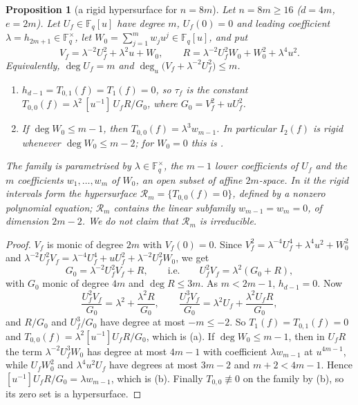 \documentclass[11pt,a4paper]{amsart}
\newtheorem{proposition}[theorem]{Proposition}
\theoremstyle{remark}
\numberwithin{equation}{section}
\newcommand{\Fq}{\mathbb{F}_q}
\begin{document}
\begin{proposition}[a rigid hypersurface for $n=8m$]\label{prop:sporadic}
Let $n=8m\ge 16$ ($d=4m$, $e=2m$). Let $U_f\in\Fq[u]$ have degree $m$, $U_f(0)=0$ and leading coefficient
$\lambda=h_{2m+1}\in\Fq^\times$, let $W_0=\sum_{j=1}^{m}w_ju^j\in\Fq[u]$, and put
\[
V_f=\lambda^{-2}U_f^2+\lambda^2u+W_0,\qquad R=\lambda^{-2}U_f^2W_0+W_0^2+\lambda^4u^2 .
\]
Equivalently, $\deg U_f=m$ and $\deg_u\bigl(V_f+\lambda^{-2}U_f^2\bigr)\le m$.
\begin{enumerate}
\item[(a)] $h_{d-1}=T_{0,1}(f)=T_1(f)=0$, so $\tau_f$ is the constant
$T_{0,0}(f)=\lambda^2\,[u^{-1}]\,U_fR/G_0$, where $G_0=V_f^2+uU_f^2$.
\item[(b)] If $\deg W_0\le m-1$, then $T_{0,0}(f)=\lambda^3w_{m-1}$. In particular $I_2(f)$ is rigid whenever
$\deg W_0\le m-2$; for $W_0=0$ this is \cite[Proposition~3.3]{ChenShort}.
\end{enumerate}
The family is parametrised by $\lambda\in\Fq^\times$, the $m-1$ lower coefficients of $U_f$ and the $m$
coefficients $w_1,\dots,w_m$ of $W_0$, an open subset of affine $2m$-space. In it the rigid intervals form the
hypersurface $\mathcal R_m=\{T_{0,0}(f)=0\}$, defined by a nonzero polynomial equation; $\mathcal R_m$ contains the
linear subfamily $w_{m-1}=w_m=0$, of dimension $2m-2$. We do not claim that $\mathcal R_m$ is irreducible.
\end{proposition}

\begin{proof}
$V_f$ is monic of degree $2m$ with $V_f(0)=0$. Since $V_f^2=\lambda^{-4}U_f^4+\lambda^4u^2+W_0^2$ and
$\lambda^{-2}U_f^2V_f=\lambda^{-4}U_f^4+uU_f^2+\lambda^{-2}U_f^2W_0$, we get
\[
G_0=\lambda^{-2}U_f^2V_f+R,\qquad\text{i.e.}\qquad U_f^2V_f=\lambda^2(G_0+R),
\]
with $G_0$ monic of degree $4m$ and $\deg R\le 3m$. As $m<2m-1$, $h_{d-1}=0$. Now
\[
\frac{U_f^2V_f}{G_0}=\lambda^2+\frac{\lambda^2R}{G_0},\qquad
\frac{U_f^3V_f}{G_0}=\lambda^2U_f+\frac{\lambda^2U_fR}{G_0},
\]
and $R/G_0$ and $U_f^3/G_0$ have degree at most $-m\le-2$. So $T_1(f)=T_{0,1}(f)=0$ and
$T_{0,0}(f)=\lambda^2[u^{-1}]U_fR/G_0$, which is (a). If $\deg W_0\le m-1$, then in $U_fR$ the term
$\lambda^{-2}U_f^3W_0$ has degree at most $4m-1$ with coefficient $\lambda w_{m-1}$ at $u^{4m-1}$, while $U_fW_0^2$
and $\lambda^4u^2U_f$ have degrees at most $3m-2$ and $m+2<4m-1$. Hence $[u^{-1}]U_fR/G_0=\lambda w_{m-1}$, which is
(b). Finally $T_{0,0}\not\equiv0$ on the family by (b), so its zero set is a hypersurface.
\end{proof}
\end{document}
